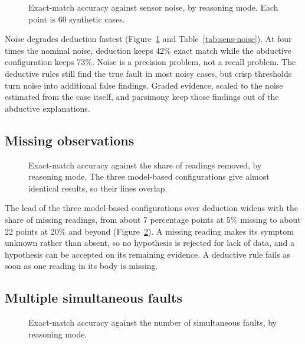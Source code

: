 \begin{figure}[htbp]
  \centering
  
  \caption{Exact-match accuracy against sensor noise, by reasoning mode. Each point is 60 synthetic cases.}
  \label{fig:sens-noise}
\end{figure}



Noise degrades deduction fastest (Figure~\ref{fig:sens-noise} and Table~\ref{tab:sens-noise}). At four times the nominal noise, deduction keeps 42\% exact match while the abductive configuration keeps 73\%. Noise is a precision problem, not a recall problem. The deductive rules still find the true fault in most noisy cases, but crisp thresholds turn noise into additional false findings. Graded evidence, scaled to the noise estimated from the case itself, and parsimony keep those findings out of the abductive explanations.

\subsection{Missing observations}

\begin{figure}[htbp]
  \centering
  
  \caption{Exact-match accuracy against the share of readings removed, by reasoning mode. The three model-based configurations give almost identical results, so their lines overlap.}
  \label{fig:sens-missing}
\end{figure}



The lead of the three model-based configurations over deduction widens with the share of missing readings, from about 7 percentage points at 5\% missing to about 22 points at 20\% and beyond (Figure~\ref{fig:sens-missing}). A missing reading makes its symptom unknown rather than absent, so no hypothesis is rejected for lack of data, and a hypothesis can be accepted on its remaining evidence. A deductive rule fails as soon as one reading in its body is missing.

\subsection{Multiple simultaneous faults}

\begin{figure}[htbp]
  \centering
  
  \caption{Exact-match accuracy against the number of simultaneous faults, by reasoning mode.}
  \label{fig:sens-multi}
\end{figure}

